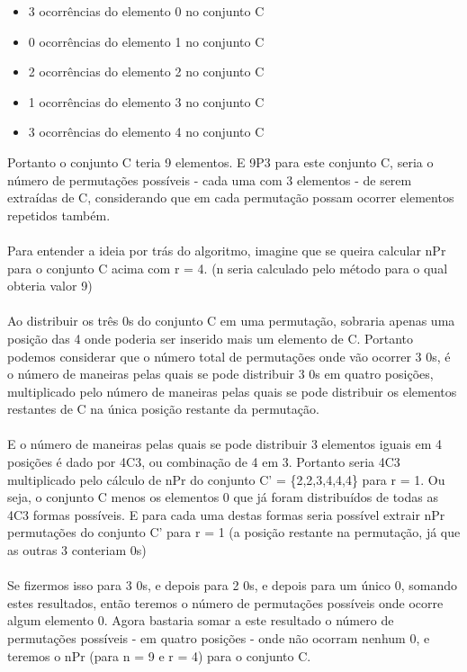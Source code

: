 \documentclass[a4paper,12pt,openany]{book}
\begin{document}
\begin{itemize}
	\item 3 ocorrências do elemento 0 no conjunto C
	\item 0 ocorrências do elemento 1 no conjunto C
	\item 2 ocorrências do elemento 2 no conjunto C
	\item 1 ocorrências do elemento 3 no conjunto C
	\item 3 ocorrências do elemento 4 no conjunto C
\end{itemize}

 Portanto o conjunto C teria 9 elementos. E 9P3 para este conjunto C, seria o número de permutações possíveis - cada uma com 3 elementos - de serem extraídas de C, considerando que em cada permutação possam ocorrer elementos repetidos também.
\\
\\
Para entender a ideia por trás do algoritmo, imagine que se queira calcular nPr para o conjunto C acima com r = 4. (n seria calculado pelo método para o qual obteria valor 9)
\\
\\
Ao distribuir os três 0s do conjunto C em uma permutação, sobraria apenas uma posição das 4 onde poderia ser inserido mais um elemento de C. Portanto podemos considerar que o número total de permutações onde vão ocorrer 3 0s, é o número de maneiras pelas quais se pode distribuir 3 0s em quatro posições, multiplicado pelo número de maneiras pelas quais se pode distribuir os elementos restantes de C na única posição restante da permutação.
\\
\\
E o número de maneiras pelas quais se pode distribuir 3 elementos iguais em 4 posições é dado por 4C3, ou combinação de 4 em 3. Portanto seria 4C3 multiplicado pelo cálculo de nPr do conjunto C' = \{2,2,3,4,4,4\} para r = 1. Ou seja, o conjunto C menos os elementos 0 que já foram distribuídos de todas as 4C3 formas possíveis. E para cada uma destas formas seria possível extrair nPr permutações do conjunto C' para r = 1 (a posição restante na permutação, já que as outras 3 conteriam 0s)
\\
\\
Se fizermos isso para 3 0s, e depois para 2 0s, e depois para um único 0, somando estes resultados, então teremos o número de permutações possíveis onde ocorre algum elemento 0. Agora bastaria somar a este resultado o número de permutações possíveis - em quatro posições - onde não ocorram nenhum 0, e teremos o nPr (para n = 9 e r = 4) para o conjunto C.
\end{document}
